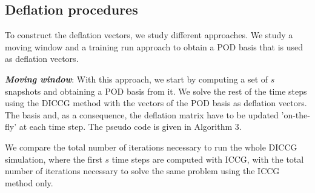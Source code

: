 \documentclass[12pt]{article}
\begin{document}
\subsection*{Deflation procedures}
\hspace{0.5cm}To construct the deflation vectors, we study different approaches. We study a moving window and a training run 
approach to obtain a POD basis that is used as deflation vectors.\par
\textbf{\emph{Moving window}}: With this approach, we start by computing a set of $s$ snapshots and obtaining a POD basis from it. 
We solve the rest of the time steps using the DICCG method with the vectors of the POD basis as deflation vectors. The basis and, 
as a consequence, the deflation matrix have to be updated 'on-the-fly' at each time step.  
The pseudo code is given in Algorithm 3.\par 
We compare the total number of iterations necessary to run the whole DICCG simulation, where the first $s$ time steps are computed 
with ICCG, with the total number of iterations necessary to solve the same problem using the ICCG method only. \par  
\vspace{0.3cm}
\renewcommand{\arraystretch}{1.1}
\end{document}
